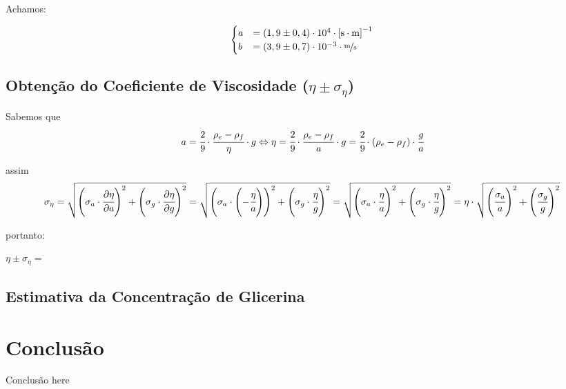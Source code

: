 \documentclass[english,brazil]{article}
\begin{document}
			Achamos:

			\[
				\begin{cases}
					a & =\left(1,9\pm0,4\right)\cdot10^{4}\cdot\unit{\left[s\cdot m\right]^{-1}}\\
					b & =\left(3,9\pm0,7\right)\cdot10^{-3}\cdot\unit{\unitfrac{m}{s}}
				\end{cases}
			\]


		\subsection{Obtenção do Coeficiente de Viscosidade ($\eta\pm\sigma_{\eta}$)}

			Sabemos que 
			\[
				a=\cfrac{2}{9}\cdot\cfrac{\rho_{e}-\rho_{f}}{\eta}\cdot g\Leftrightarrow\eta=\cfrac{2}{9}\cdot\cfrac{\rho_{e}-\rho_{f}}{a}\cdot g=\cfrac{2}{9}\cdot\left(\rho_{e}-\rho_{f}\right)\cdot\cfrac{g}{a}
			\]


			assim 
			\[
				\sigma_{\eta}=\sqrt{\left(\sigma_{a}\cdot\cfrac{\partial\eta}{\partial a}\right)^{2}+\left(\sigma_{g}\cdot\cfrac{\partial\eta}{\partial g}\right)^{2}}=\sqrt{\left(\sigma_{a}\cdot\left(-\cfrac{\eta}{a}\right)\right)^{2}+\left(\sigma_{g}\cdot\cfrac{\eta}{g}\right)^{2}}=\sqrt{\left(\sigma_{a}\cdot\cfrac{\eta}{a}\right)^{2}+\left(\sigma_{g}\cdot\cfrac{\eta}{g}\right)^{2}}=\eta\cdot\sqrt{\left(\cfrac{\sigma_{a}}{a}\right)^{2}+\left(\cfrac{\sigma_{g}}{g}\right)^{2}}
			\]


			portanto:

			$\eta\pm\sigma_{\eta}=$


		\subsection{Estimativa da Concentração de Glicerina}


	\section{Conclusão}

	Conclusão here 
\end{document}
